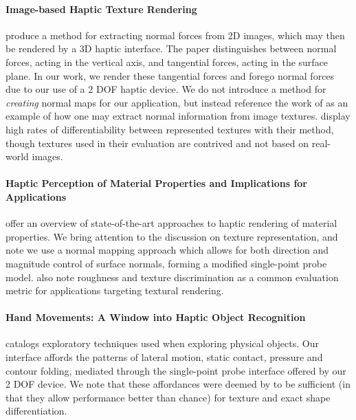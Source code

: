 \paragraph{Image-based Haptic Texture Rendering}
\citet{li2010image} produce a method for extracting normal forces from 2D images, which may then be rendered by a 3D haptic interface. The paper distinguishes between normal forces, acting in the vertical axis, and tangential forces, acting in the surface plane. In our work, we render these tangential forces and forego normal forces due to our use of a 2 DOF haptic device. We do not introduce a method for \textit{creating} normal maps for our application, but instead reference the work of \citet{li2010image} as an example of how one may extract normal information from image textures. \citet{li2010image} display high rates of differentiability between represented textures with their method, though textures used in their evaluation are contrived and not based on real-world images.

\paragraph{Haptic Perception of Material Properties and Implications for Applications}
\citet{klatzky2013haptic} offer an overview of state-of-the-art approaches to haptic rendering of material properties. We bring attention to the discussion on texture representation, and note we use a normal mapping approach which allows for both direction and magnitude control of surface normals, forming a modified single-point probe model. \citet{klatzky2013haptic} also note roughness and texture discrimination as a common evaluation metric for applications targeting textural rendering.

\paragraph{Hand Movements: A Window into Haptic Object Recognition}
\citet{LEDERMAN1987342} catalogs exploratory techniques used when exploring physical objects. Our interface affords the patterns of lateral motion, static contact, pressure and contour folding, mediated through the single-point probe interface offered by our 2 DOF device. We note that these affordances were deemed by \citet{LEDERMAN1987342} to be sufficient (in that they allow performance better than chance) for texture and exact shape differentiation.

